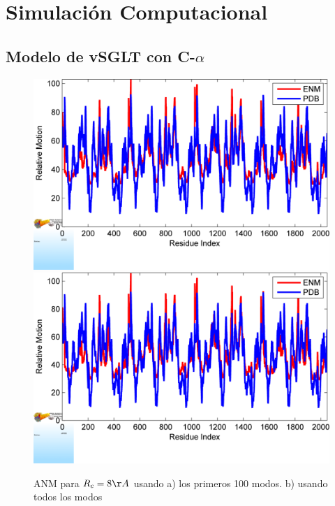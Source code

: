 \chapter{Simulaci\'{o}n Computacional}
\section{Modelo de vSGLT con C-$\alpha$}
\begin{figure}
 \centering
  \includegraphics[scale=0.3]{./Kap4/ANM/Ca/BF_plot_100.png}
 \includegraphics[scale=0.3]{./Kap4/ANM/Ca/BF_plot.png}
 \caption{ANM para $R_c=8\AA$ usando a) los primeros 100 modos. b) usando todos los modos}
\end{figure}
